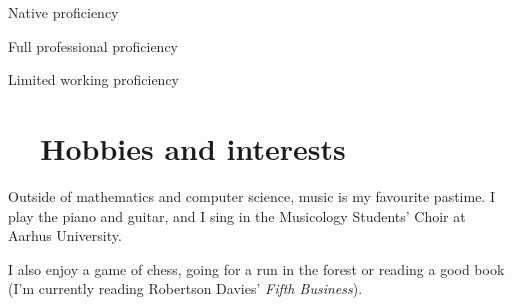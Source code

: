 \documentclass[article, a4paper, 11pt, oneside]{memoir}
\begin{document}
\begin{description}[itemsep=0pt]
    \item[Danish] Native proficiency
    \item[English] Full professional proficiency
    \item[German] Limited working proficiency
\end{description}


\section[Hobbies and interests]{\faMusic~~Hobbies and interests}

Outside of mathematics and computer science, music is my favourite pastime. I play the piano and guitar, and I sing in the Musicology Students' Choir at Aarhus University.

I also enjoy a game of chess, going for a run in the forest or reading a good book (I'm currently reading Robertson Davies' \emph{Fifth Business}).
\end{document}
